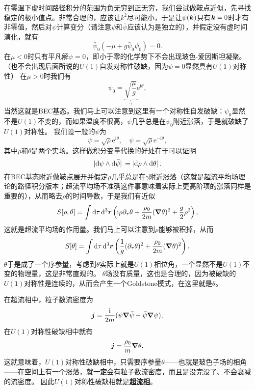 \documentclass[hyperref, UTF8, a4paper]{ctexart}
\newcommand*{\ii}{\mathrm{i}}
\newcommand*{\ee}{\mathrm{e}}
\newcommand{\concept}[1]{\underline{\textbf{#1}}}
\renewcommand{\emph}{\textbf}
\begin{document}
在零温下虚时间路径积分的范围为负无穷到正无穷，我们尝试做鞍点近似，先寻找稳定的极小值点。非常合理的，应该让$k^2$尽可能小，于是让$\psi(\vb*{k})$只有$\vb*{k}=0$时才有非零值，然后对$\psi$计算变分（请注意$\psi$和$\bar{\psi}$应该认为是独立的），并假定没有虚时间演化，就有
\[
    \bar{\psi}_0 \left( - \mu + g \bar{\psi}_0 \psi_0 \right) = 0.
\]
在$\mu < 0$时只有平凡解$\psi=0$，即小于零的化学势下不会出现玻色-爱因斯坦凝聚。（也不会出现后面所说的$U(1)$自发对称性破缺，因为$\psi=0$显然具有$U(1)$对称性）
在$\mu > 0$时我们有
\begin{equation}
    \psi_0 = \underbrace{\sqrt{\frac{\mu}{g}}}_{\gamma} \ee^{\ii \theta},
    \label{eq:bec-ground}
\end{equation}
当然这就是BEC基态。我们马上可以注意到这里有一个对称性自发破缺：$\psi_0$显然不是$U(1)$不变的，而如果温度不很高，$\psi$几乎总是在$\psi_0$附近涨落，于是就破缺了$U(1)$对称性。
我们设一般的$\psi$为
\begin{equation}
    \psi = \sqrt{\rho} \ee^{\ii \theta}, \quad \psi = \sqrt{\rho} \ee^{- \ii \theta},
\end{equation}
其中$\rho$和$\theta$是两个实场。这样做积分变量代换的好处在于可以证明
\[
    \abs*{\dd{\psi} \wedge \dd{\bar{\psi}}} = \abs*{\dd{\rho} \wedge \dd{\theta}}.
\]
在BEC基态附近做鞍点展开并假定$\rho$几乎总是在$\gamma$附近涨落（这就是超流平均场理论的路径积分版本；超流平均场不准确这件事意味着实际上更高阶项的涨落同样是重要的），从而略去$\rho$的时间导数，于是我们有近似
\begin{equation}
    S[\rho, \theta] = \int \dd{\tau} \dd[3]{\vb*{r}} \left( \ii \rho \partial_\tau \theta + \frac{\rho_0}{2m} (\grad{\theta})^2 + \frac{g}{2} \rho^2 \right),
\end{equation}
这就是超流平均场的作用量。我们马上可以注意到$\rho$能够被积掉，从而
\begin{equation}
    S[\theta] = \int \dd{\tau} \dd[3]{\vb*{r}} \left( \frac{1}{g} (\partial_\tau \theta)^2 + \frac{\rho_0}{2m} (\grad{\theta})^2 \right).
    \label{eq:quantum-xy}
\end{equation}
$\theta$于是成了一个序参量，考虑到$\theta$实际上就是$U(1)$相位角，一个显然不是$U(1)$不变的物理量，这是非常直观的。
$\theta$场没有质量，这也是合理的，因为被破缺的$U(1)$对称性是连续的，从而会产生一个Goldstone模式，在这里就是$\theta$。

在超流相中，粒子数流密度为
\[
    \vb*{j} = \frac{\ii}{2m} ( \psi \grad{\bar{\psi}} - \bar{\psi} \grad{\psi} ),
\]
在$U(1)$对称性破缺相中就有
\begin{equation}
    \vb*{j} = \frac{\rho_0}{m} \grad{\theta}.
\end{equation}
这就意味着，$U(1)$对称性破缺相中，只需要序参量$\theta$——也就是玻色子场的相角——在空间上有一个涨落，就\emph{一定}会有粒子数流密度，而且是没完没了、不会衰减的流密度。
因此$U(1)$对称性破缺相就是\concept{超流相}。
\end{document}
